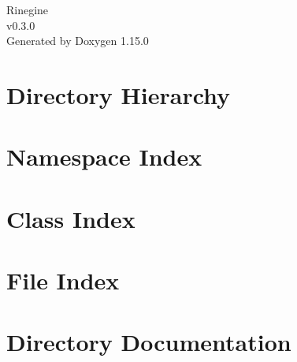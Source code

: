 \documentclass[twoside]{book}
\newcommand{\+}{\discretionary{\mbox{\scriptsize$\hookleftarrow$}}{}{}}
\newcommand{\clearemptydoublepage}{%
    \newpage{\pagestyle{empty}\cleardoublepage}%
  }
\begin{document}
  \raggedbottom
    \hypersetup{pageanchor=false,
                bookmarksnumbered=true,
                pdfencoding=unicode
               }
  \begin{titlepage}
  \vspace*{7cm}
  \begin{center}%
  {\Large Rinegine}\\
  [1ex]\large v0.\+3.\+0 \\
  \vspace*{1cm}
  {\large Generated by Doxygen 1.15.0}\\
  \end{center}
  \end{titlepage}
  \clearemptydoublepage
  \tableofcontents
  \clearemptydoublepage
  \hypersetup{pageanchor=true}
\chapter{Directory Hierarchy}

\chapter{Namespace Index}

\chapter{Class Index}

\chapter{File Index}

\chapter{Directory Documentation}

















\end{document}
